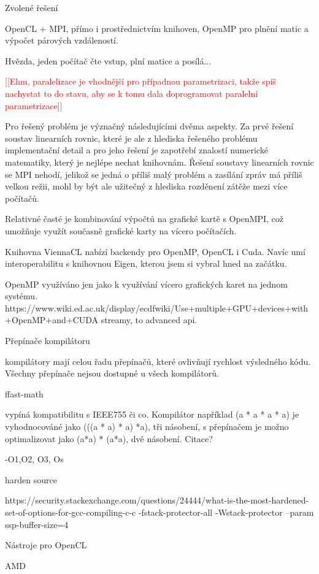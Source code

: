 \documentclass[10pt,draft,oneside]{fithesis2}
\newcommand\fixme[1]{\textcolor{red}{[[#1]]}}
\begin{document}
Zvolené řešení

OpenCL + MPI, přímo i prostřednictvím knihoven, OpenMP pro plnění matic a výpočet párových vzdáleností.

Hvězda, jeden počítač čte vstup, plní matice a posílá...

\fixme{Ehm, paralelizace je vhodnější pro případnou parametrizaci, takže spíš nachystat to do stavu, aby se k tomu dala doprogramovat paralelní parametrizace}

Pro řešený problém je význačný následujícími dvěma aspekty. Za prvé řešení soustav linearních rovnic, které je ale z hlediska řešeného problému implementační detail a pro jeho řešení je zapotřebí znalostí numerické matematiky, který je nejlépe nechat knihovnám. Řešení soustavy linearních rovnic se MPI nehodí, jelikož se jedná o příliš malý problém a zasílání zpráv má příliš velkou režii, mohl by být ale užitečný z hlediska rozděnení zátěže mezi více počítačů.

Relativné časté je kombinování výpočtů na grafické kartě s OpenMPI, což umožňuje využít současně grafické karty na vícero počítačích.

Knihovna ViennaCL nabízí backendy pro OpenMP, OpenCL i Cuda. Navíc umí interoperabilitu s knihovnou Eigen, kterou jsem si vybral hned na začátku.

OpenMP využíváno jen jako k využívání vícero grafických karet na jednom systému. https://www.wiki.ed.ac.uk/display/ecdfwiki/Use+multiple+GPU+devices+with+OpenMP+and+CUDA streamy, to advanced api.

Přepínače kompilátoru

kompilátory mají celou řadu přepínačů, které ovlivňují rychlost výsledného kódu. Všechny přepínače nejsou dostupné u všech kompilátorů.

ffast-math

vypíná kompatibilitu s IEEE755 či co. Kompilátor například (a * a * a * a) je vyhodnocováné jako (((a * a) * a) *a), tři násobení, s přepínačem je možno optimalizovat jako (a*a) * (a*a), dvě násobení. Citace?

-O1,O2, O3, Os

harden source

https://security.stackexchange.com/questions/24444/what-is-the-most-hardened-set-of-options-for-gcc-compiling-c-c
-fstack-protector-all -Wstack-protector --param ssp-buffer-size=4 

Nástroje pro OpenCL

AMD
\end{document}
